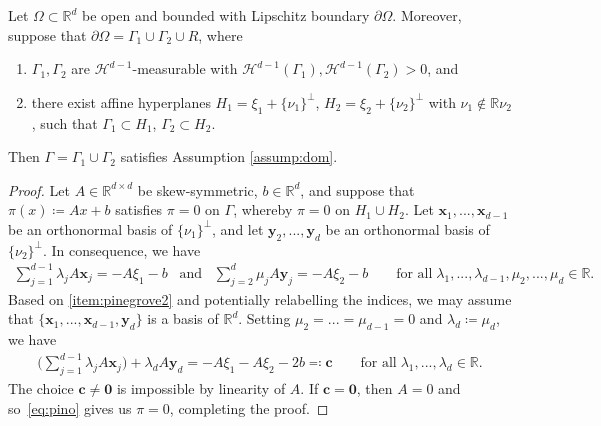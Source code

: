 \documentclass[reqno,a4paper]{amsart}
\def\vec#1{\boldsymbol{#1}}
\def\R{\mathbb{R}}
\def\b0{\vec{0}}
\begin{document}
	\begin{corollary} \label{cor:polyhedral}
		Let $\Omega\subset\R^{d}$ be open and bounded with Lipschitz boundary $\partial\Omega$. 
		Moreover, suppose that $\partial\Omega = \Gamma_{1}\cup \Gamma_{2}\cup R$, where 
		\begin{enumerate}
			\item\label{item:pinegrove1} $\Gamma_{1},\Gamma_{2}$ are $\mathcal{H}^{d-1}$-measurable with  $\mathcal{H}^{d-1}(\Gamma_{1}),\mathcal{H}^{d-1}(\Gamma_{2})>0$, and 
			\item\label{item:pinegrove2} there exist affine hyperplanes $H_{1}=\xi_{1}+\{\nu_{1}\}^{\bot}$, $H_{2}=\xi_{2}+\{\nu_{2}\}^{\bot}$ with $\nu_{1}\notin\R \nu_{2}$, such that $\Gamma_{1}\subset H_{1}$, $\Gamma_{2}\subset H_{2}$. 
		\end{enumerate}
		Then $\Gamma=\Gamma_{1}\cup\Gamma_{2}$ satisfies Assumption \ref{assump:dom}. 
	\end{corollary}
	\begin{proof}
		Let $A\in\R^{d\times d}$ be skew-symmetric,  $b\in\R^{d}$, and suppose that $\pi(x)\coloneqq Ax+b$ satisfies $\pi=0$ on $\Gamma$, whereby $\pi=0$ on $H_{1}\cup H_{2}$. 
		Let $\mathbf{x}_{1},...,\mathbf{x}_{d-1}$ be an orthonormal basis of $\{\nu_{1}\}^{\bot}$, and let $\mathbf{y}_{2},...,\mathbf{y}_{d}$ be an orthonormal basis of $\{\nu_{2}\}^{\bot}$. 
		In consequence, we have 
		\begin{align}\label{eq:pino}
			\sum_{j=1}^{d-1}\lambda_{j}A\mathbf{x}_{j} = -A\xi_{1} - b \;\;\;\text{and}\;\;\;\sum_{j=2}^{d}\mu_{j}A\mathbf{y}_{j} = -A\xi_{2} - b\qquad\text{for all}\;\lambda_{1},...,\lambda_{d-1},\mu_{2},...,\mu_{d}\in\R. 
		\end{align}
		Based on \ref{item:pinegrove2} and potentially relabelling the indices, we may assume that $\{\mathbf{x}_{1},...,\mathbf{x}_{d-1},\mathbf{y}_{d}\}$ is a basis of $\R^{d}$. Setting $\mu_{2}=...=\mu_{d-1}=0$ and $\lambda_{d}\coloneqq\mu_{d}$, we have 
		\begin{align*}
			\Big(\sum_{j=1}^{d-1}\lambda_{j}A\mathbf{x}_{j}\Big) + \lambda_{d}A\mathbf{y}_{d} = -A\xi_{1}-A\xi_{2}-2b\eqqcolon \mathbf{c}\qquad \text{for all}\;\lambda_{1},...,\lambda_{d}\in\R. 
		\end{align*}
		The choice $\mathbf{c}\neq \b0$ is impossible by linearity of $A$. 
		If $\mathbf{c}=\b0$, then $A=0$ and so~\eqref{eq:pino} gives us $\pi=0$, completing the proof. 
	\end{proof}
	
\end{document}

